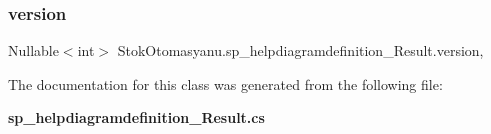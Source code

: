 \subsubsection{version}
{\footnotesize\ttfamily Nullable$<$int$>$ Stok\+Otomasyanu.\+sp\+\_\+helpdiagramdefinition\+\_\+\+Result.\+version\hspace{0.3cm}{\ttfamily [get]}, {\ttfamily [set]}}



The documentation for this class was generated from the following file\+:\begin{DoxyCompactItemize}
\item 
\textbf{ sp\+\_\+helpdiagramdefinition\+\_\+\+Result.\+cs}\end{DoxyCompactItemize}
